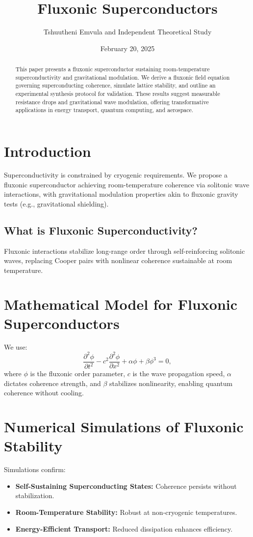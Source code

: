 \documentclass{article}
\title{Fluxonic Superconductors}
\author{Tshuutheni Emvula and Independent Theoretical Study}
\date{February 20, 2025}
\begin{document}
\maketitle

\begin{abstract}
This paper presents a fluxonic superconductor sustaining room-temperature superconductivity and gravitational modulation. We derive a fluxonic field equation governing superconducting coherence, simulate lattice stability, and outline an experimental synthesis protocol for validation. These results suggest measurable resistance drops and gravitational wave modulation, offering transformative applications in energy transport, quantum computing, and aerospace.
\end{abstract}

\section{Introduction}
Superconductivity is constrained by cryogenic requirements. We propose a fluxonic superconductor achieving room-temperature coherence via solitonic wave interactions, with gravitational modulation properties akin to fluxonic gravity tests (e.g., gravitational shielding).

\subsection{What is Fluxonic Superconductivity?}
Fluxonic interactions stabilize long-range order through self-reinforcing solitonic waves, replacing Cooper pairs with nonlinear coherence sustainable at room temperature.

\section{Mathematical Model for Fluxonic Superconductors}
We use:
\begin{equation}
\frac{\partial^2 \phi}{\partial t^2} - c^2 \frac{\partial^2 \phi}{\partial x^2} + \alpha \phi + \beta \phi^3 = 0,
\end{equation}
where \(\phi\) is the fluxonic order parameter, \(c\) is the wave propagation speed, \(\alpha\) dictates coherence strength, and \(\beta\) stabilizes nonlinearity, enabling quantum coherence without cooling.

\section{Numerical Simulations of Fluxonic Stability}
Simulations confirm:
\begin{itemize}
    \item \textbf{Self-Sustaining Superconducting States:} Coherence persists without stabilization.
    \item \textbf{Room-Temperature Stability:} Robust at non-cryogenic temperatures.
    \item \textbf{Energy-Efficient Transport:} Reduced dissipation enhances efficiency.
\end{itemize}
\end{document}

